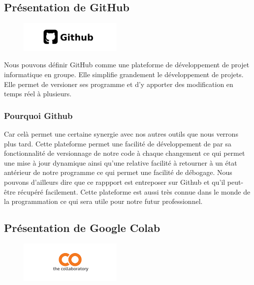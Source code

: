 \hypertarget{Pruxe9sentation-de-GitHub}{%
\subsection{Présentation de GitHub}
\label{Pruxe9sentation-de-GitHub}}

\begin{figure}[h]
  \begin{center}
  \includegraphics[width=5cm]{./images/github.jpg}
  \end{center}
\end{figure}

Nous pouvons définir GitHub comme une plateforme de développement de projet informatique en groupe. Elle simplifie grandement le développement de projets. Elle permet de versioner ses programme et d'y apporter des modification en temps réel à plusieurs.

\hypertarget{Pourquoi-Github}{%
\subsubsection{Pourquoi Github}
\label{Pourquoi-Github}}
Car celà permet une certaine synergie avec nos autres outils que nous verrons plus tard. Cette plateforme permet une facilité de développement de par sa fonctionnalité de versionnage de notre code à chaque changement ce qui permet une mise à jour dynamique ainsi qu'une relative facilité à retourner à un état antérieur de notre programme ce qui permet une facilité de débogage. Nous pouvons d'ailleurs dire que ce rappport est entreposer sur Github et qu'il peut-être récupéré facilement. Cette plateforme est aussi très connue dans le monde de la programmation ce qui sera utile pour notre futur professionnel.

\hypertarget{Pruxe9sentation-de-Google-Colab}{%
\subsection{Présentation de Google Colab}
\label{Pruxe9sentation-de-Google-Colab}}

\begin{figure}[h]
\begin{center}
\includegraphics[width=5cm]{./images/Colab_logo.png}
\end{center}
\end{figure}

